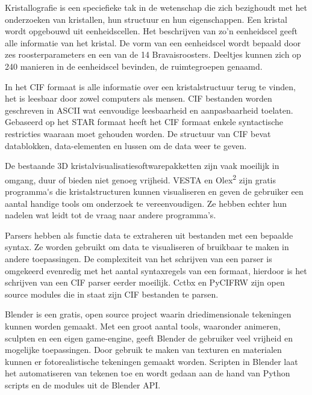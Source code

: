 Kristallografie is een speciefieke tak in de wetenschap die zich bezighoudt met het onderzoeken van kristallen, hun structuur en hun eigenschappen. Een kristal wordt opgebouwd uit eenheidscellen. Het beschrijven van zo'n eenheidscel geeft alle informatie van het kristal. De vorm van een eenheidscel wordt bepaald door zes roosterparameters en een van de 14 Bravaisroosters. Deeltjes kunnen zich op 240 manieren in de eenheidscel bevinden, de ruimtegroepen genaamd.
\par
In het CIF formaat is alle informatie over een kristalstructuur terug te vinden, het is leesbaar door zowel computers als mensen. CIF bestanden worden geschreven in ASCII wat eenvoudige leesbaarheid en aanpasbaarheid toelaten. Gebaseerd op het STAR formaat heeft het CIF formaat enkele syntactische restricties waaraan moet gehouden worden. De structuur van CIF bevat datablokken, data-elementen en lussen om de data weer te geven.
\par
De bestaande 3D kristalvisualisatiesoftwarepakketten zijn vaak moeilijk in omgang, duur of bieden niet genoeg vrijheid. VESTA en Olex\textsuperscript{2} zijn gratis programma\'{}s die kristalstructuren kunnen visualiseren en geven de gebruiker een aantal handige tools om onderzoek te vereenvoudigen. Ze hebben echter hun nadelen wat leidt tot de vraag naar andere programma's.
\par
Parsers hebben als functie data te extraheren uit bestanden met een bepaalde syntax. Ze worden gebruikt om data te visualiseren of bruikbaar te maken in andere toepassingen. De complexiteit van het schrijven van een parser is omgekeerd evenredig met het aantal syntaxregels van een formaat, hierdoor is het schrijven van een CIF parser eerder moeilijk. Cctbx en PyCIFRW zijn open source modules die in staat zijn CIF bestanden te parsen.
\par
Blender is een gratis, open source project waarin driedimensionale tekeningen kunnen worden gemaakt. Met een groot aantal tools, waaronder animeren, sculpten en een eigen game-engine, geeft Blender de gebruiker veel vrijheid en mogelijke toepassingen. Door gebruik te maken van texturen en materialen kunnen er fotorealistische tekeningen gemaakt worden. Scripten in Blender laat het automatiseren van tekenen toe en wordt gedaan aan de hand van Python scripts en de modules uit de Blender API.   